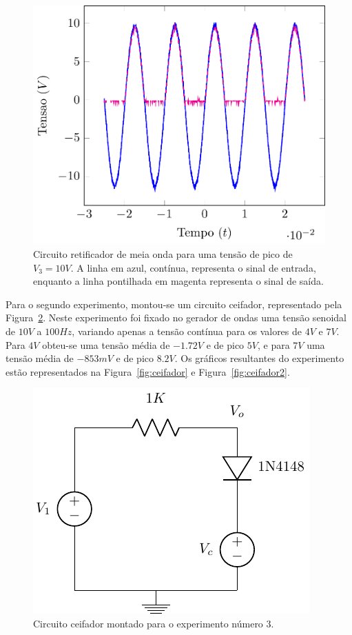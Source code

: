 \documentclass[12pt,a4paper]{article}
\begin{document}
\begin{figure}[htpb]
  \centering
  \includegraphics[width=0.8\linewidth]{./retificador_10.pdf}
  \caption{Circuito retificador de meia onda para uma tensão de pico de $V_3=10V$. A linha em azul, contínua, representa o sinal de entrada, enquanto a linha pontilhada em magenta representa o sinal de saída.}
  \label{fig:retificador10}
\end{figure}

Para o segundo experimento, montou-se um circuito ceifador, representado pela Figura~\ref{fig:circ_ceifador}. Neste experimento foi fixado no gerador de ondas uma tensão senoidal de $10V$ a $100Hz$, variando apenas a tensão contínua para os valores de $4V$ e $7V$.  Para $4V$ obteu-se uma tensão média de $-1.72V$ e de pico $5V$, e para $7V$ uma tensão média de $-853mV$ e de pico $8.2V$. Os gráficos resultantes do experimento estão representados na Figura~\ref{fig:ceifador} e Figura~\ref{fig:ceifador2}.
\begin{figure}[htpb]
  \centering
  \includegraphics{circ_ceifador.pdf}
  \caption{Circuito ceifador montado para o experimento número 3.}
  \label{fig:circ_ceifador}
\end{figure}
\end{document}
